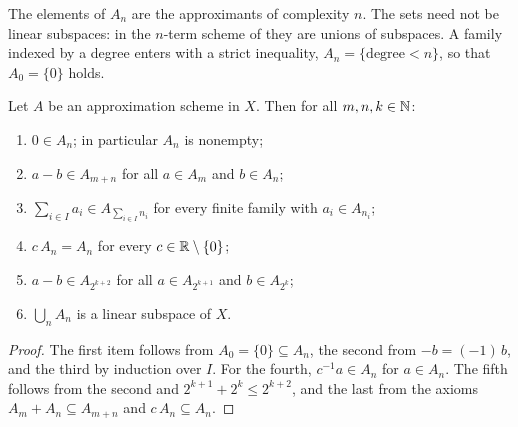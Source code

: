 The elements of $A_n$ are the approximants of complexity $n$. The sets need not be linear
subspaces: in the $n$-term scheme of  they are unions of subspaces. A family
indexed by a degree enters with a strict inequality, $A_n = \{\text{degree} < n\}$, so that
$A_0 = \{0\}$ holds.

\begin{lemma}
\label{lem:scheme-basic}
\leanok
{}
Let $A$ be an approximation scheme in $X$. Then for all $m, n, k \in \mathbb{N}$:
\begin{enumerate}
  \item $0 \in A_n$; in particular $A_n$ is nonempty;
  \item $a - b \in A_{m+n}$ for all $a \in A_m$ and $b \in A_n$;
  \item $\sum_{i \in I} a_i \in A_{\sum_{i \in I} n_i}$ for every finite family with
    $a_i \in A_{n_i}$;
  \item $c\,A_n = A_n$ for every $c \in \mathbb{R} \setminus \{0\}$;
  \item $a - b \in A_{2^{k+2}}$ for all $a \in A_{2^{k+1}}$ and $b \in A_{2^k}$;
  \item $\bigcup_n A_n$ is a linear subspace of $X$.
\end{enumerate}
\end{lemma}

\begin{proof}
\leanok
The first item follows from $A_0 = \{0\} \subseteq A_n$, the second from $-b = (-1)\,b$, and
the third by induction over $I$. For the fourth, $c^{-1} a \in A_n$ for $a \in A_n$. The fifth
follows from the second and $2^{k+1} + 2^k \leq 2^{k+2}$, and the last from the axioms
$A_m + A_n \subseteq A_{m+n}$ and $c\,A_n \subseteq A_n$.
\end{proof}

